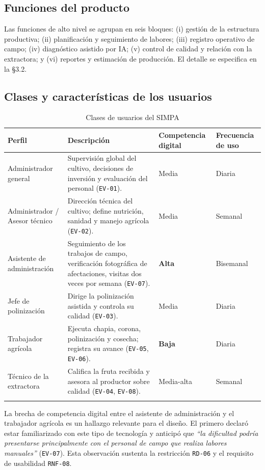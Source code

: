 \documentclass[11pt,a4paper]{article}
\newcommand{\id}[1]{\texttt{\begingroup\hyphenpenalty=10000\relax#1\endgroup}}
\renewcommand{\id}[1]{\texttt{#1}}
\begin{document}
\subsection{Funciones del producto}

Las funciones de alto nivel se agrupan en seis bloques: (i) gestión de la estructura productiva;
(ii) planificación y seguimiento de labores; (iii) registro operativo de campo; (iv) diagnóstico
asistido por IA; (v) control de calidad y relación con la extractora; y (vi) reportes y estimación
de producción. El detalle se especifica en la §3.2.

\subsection{Clases y características de los usuarios}

\begin{longtable}{|L{3.0cm}|L{5.4cm}|L{3.2cm}|L{2.8cm}|}
\hline
{}\textbf{Perfil} & \textbf{Descripción} & \textbf{Competencia digital} & \textbf{Frecuencia de uso} \\
\hline
\endhead
Administrador general & Supervisión global del cultivo, decisiones de inversión y evaluación del personal (\id{EV-01}). & Media & Diaria \\ \hline
Administrador / Asesor técnico & Dirección técnica del cultivo; define nutrición, sanidad y manejo agrícola (\id{EV-02}). & Media & Semanal \\ \hline
Asistente de administración & Seguimiento de los trabajos de campo, verificación fotográfica de afectaciones, visitas dos veces por semana (\id{EV-07}). & \textbf{Alta} & Bisemanal \\ \hline
Jefe de polinización & Dirige la polinización asistida y controla su calidad (\id{EV-03}). & Media & Diaria \\ \hline
Trabajador agrícola & Ejecuta chapia, corona, polinización y cosecha; registra su avance (\id{EV-05}, \id{EV-06}). & \textbf{Baja} & Diaria \\ \hline
Técnico de la extractora & Califica la fruta recibida y asesora al productor sobre calidad (\id{EV-04}, \id{EV-08}). & Media-alta & Semanal \\ \hline
\caption{Clases de usuarios del SIMPA}
\end{longtable}

\noindent
La brecha de competencia digital entre el asistente de administración y el trabajador agrícola es
un hallazgo relevante para el diseño. El primero declaró estar familiarizado con este tipo de
tecnología y anticipó que \emph{``la dificultad podría presentarse principalmente con el personal de
campo que realiza labores manuales''} (\id{EV-07}). Esta observación sustenta la restricción
\id{RD-06} y el requisito de usabilidad \id{RNF-08}.
\end{document}
